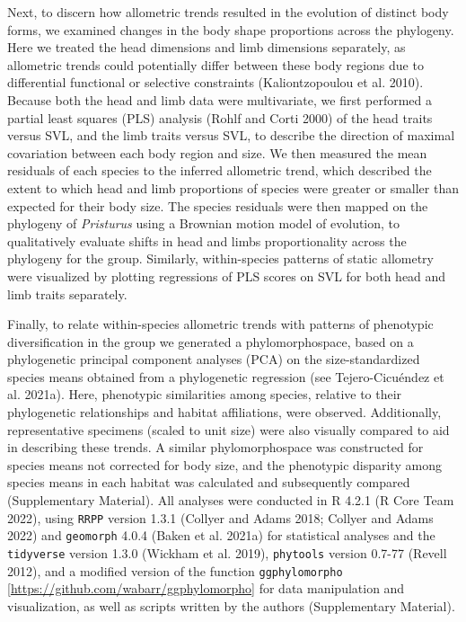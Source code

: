 \documentclass[
  11pt,
]{article}
\begin{document}
Next, to discern how allometric trends resulted in the evolution of
distinct body forms, we examined changes in the body shape proportions
across the phylogeny. Here we treated the head dimensions and limb
dimensions separately, as allometric trends could potentially differ
between these body regions due to differential functional or selective
constraints (Kaliontzopoulou et al. 2010). Because both the head and
limb data were multivariate, we first performed a partial least squares
(PLS) analysis (Rohlf and Corti 2000) of the head traits versus SVL, and
the limb traits versus SVL, to describe the direction of maximal
covariation between each body region and size. We then measured the mean
residuals of each species to the inferred allometric trend, which
described the extent to which head and limb proportions of species were
greater or smaller than expected for their body size. The species
residuals were then mapped on the phylogeny of \emph{Pristurus} using a
Brownian motion model of evolution, to qualitatively evaluate shifts in
head and limbs proportionality across the phylogeny for the group.
Similarly, within-species patterns of static allometry were visualized
by plotting regressions of PLS scores on SVL for both head and limb
traits separately. \hfill\break

Finally, to relate within-species allometric trends with patterns of
phenotypic diversification in the group we generated a phylomorphospace,
based on a phylogenetic principal component analyses (PCA) on the
size-standardized species means obtained from a phylogenetic regression
(see Tejero-Cicuéndez et al. 2021a). Here, phenotypic similarities among
species, relative to their phylogenetic relationships and habitat
affiliations, were observed. Additionally, representative specimens
(scaled to unit size) were also visually compared to aid in describing
these trends. A similar phylomorphospace was constructed for species
means not corrected for body size, and the phenotypic disparity among
species means in each habitat was calculated and subsequently compared
(Supplementary Material). All analyses were conducted in R 4.2.1 (R Core
Team 2022), using \texttt{RRPP} version 1.3.1 (Collyer and Adams 2018;
Collyer and Adams 2022) and \texttt{geomorph} 4.0.4 (Baken et al. 2021a)
for statistical analyses and the \texttt{tidyverse} version 1.3.0
(Wickham et al. 2019), \texttt{phytools} version 0.7-77 (Revell 2012),
and a modified version of the function \texttt{ggphylomorpho}
{[}\url{https://github.com/wabarr/ggphylomorpho}{]} for data
manipulation and visualization, as well as scripts written by the
authors (Supplementary Material).
\end{document}
